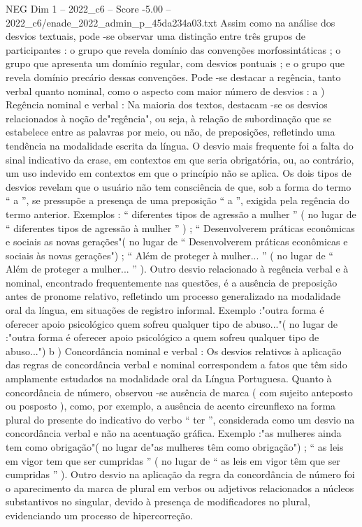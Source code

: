 \begin{textsample}{NEG Dim 1 – 2022\_c6 – Score -5.00 – 2022\_c6/enade\_2022\_admin\_p\_45da234a03.txt}
Assim como na análise dos desvios textuais, pode -se observar uma distinção entre três grupos de participantes : o grupo que revela domínio das convenções morfossintáticas ; o grupo que apresenta um domínio regular, com desvios pontuais ; e o grupo que revela domínio precário dessas convenções.
Pode -se destacar a regência, tanto verbal quanto nominal, como o aspecto com maior número de desvios : a ) Regência nominal e verbal : Na maioria dos textos, destacam -se os desvios relacionados à noção de"regência", ou seja, à relação de subordinação que se estabelece entre as palavras por meio, ou não, de preposições, refletindo uma tendência na modalidade escrita da língua.
O desvio mais frequente foi a falta do sinal indicativo da crase, em contextos em que seria obrigatória, ou, ao contrário, um uso indevido em contextos em que o princípio não se aplica.
Os dois tipos de desvios revelam que o usuário não tem consciência de que, sob a forma do termo “ a ”, se pressupõe a presença de uma preposição “ a ”, exigida pela regência do termo anterior.
Exemplos : “ diferentes tipos de agressão a mulher ” ( no lugar de “ diferentes tipos de agressão à mulher ” ) ; “ Desenvolverem práticas econômicas e sociais as novas gerações"( no lugar de “ Desenvolverem práticas econômicas e sociais às novas gerações") ; “ Além de proteger à mulher... ” ( no lugar de “ Além de proteger a mulher... ” ).
Outro desvio relacionado à regência verbal e à nominal, encontrado frequentemente nas questões, é a ausência de preposição antes de pronome relativo, refletindo um processo generalizado na modalidade oral da língua, em situações de registro informal.
Exemplo :"outra forma é oferecer apoio psicológico quem sofreu qualquer tipo de abuso..."( no lugar de :"outra forma é oferecer apoio psicológico a quem sofreu qualquer tipo de abuso...") b ) Concordância nominal e verbal : Os desvios relativos à aplicação das regras de concordância verbal e nominal correspondem a fatos que têm sido amplamente estudados na modalidade oral da Língua Portuguesa.
Quanto à concordância de número, observou -se ausência de marca ( com sujeito anteposto ou posposto ), como, por exemplo, a ausência de acento circunflexo na forma plural do presente do indicativo do verbo “ ter ”, considerada como um desvio na concordância verbal e não na acentuação gráfica.
Exemplo :"as mulheres ainda tem como obrigação"( no lugar de"as mulheres têm como obrigação") ; “ as leis em vigor tem que ser cumpridas ” ( no lugar de “ as leis em vigor têm que ser cumpridas ” ).
Outro desvio na aplicação da regra da concordância de número foi o aparecimento da marca de plural em verbos ou adjetivos relacionados a núcleos substantivos no singular, devido à presença de modificadores no plural, evidenciando um processo de hipercorreção.

\end{textsample}
